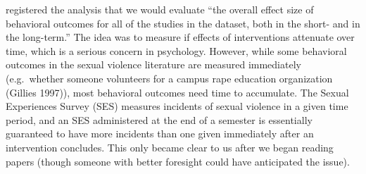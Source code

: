 \documentclass{article}
\begin{document}
\begin{itemize}
  registered the analysis that we would evaluate ``the overall effect
  size of behavioral outcomes for all of the studies in the dataset,
  both in the short- and in the long-term.'' The idea was to measure if
  effects of interventions attenuate over time, which is a serious
  concern in psychology. However, while some behavioral outcomes in the
  sexual violence literature are measured immediately (e.g.~whether
  someone volunteers for a campus rape education organization (Gillies
  1997)), most behavioral outcomes need time to accumulate. The Sexual
  Experiences Survey (SES) measures incidents of sexual violence in a
  given time period, and an SES administered at the end of a semester is
  essentially guaranteed to have more incidents than one given
  immediately after an intervention concludes. This only became clear to
  us after we began reading papers (though someone with better foresight
  could have anticipated the issue).


\end{itemize}
\end{document}
